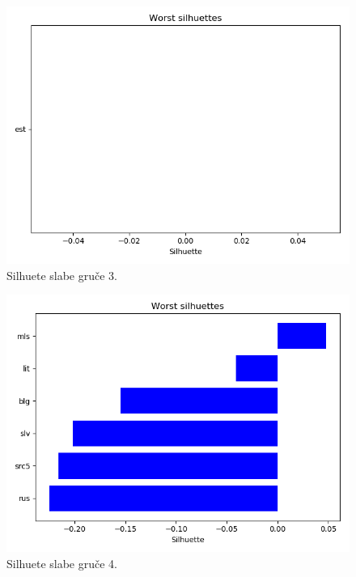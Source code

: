 \documentclass[a4paper,11pt]{article}
\begin{document}
\begin{figure}[htbp]
	\begin{center}
		\includegraphics[scale=0.5]{worst3.png}
		\caption{Silhuete slabe gruče 3.}
		\label{slika1}
	\end{center}
\end{figure}

\begin{figure}[htbp]
	\begin{center}
		\includegraphics[scale=0.5]{worst4.png}
		\caption{Silhuete slabe gruče 4.}
		\label{slika1}
	\end{center}
\end{figure}
\end{document}
